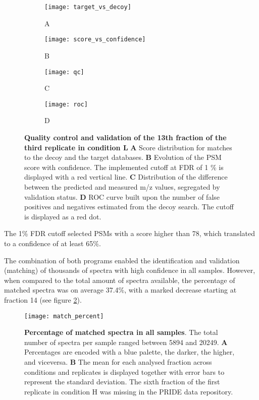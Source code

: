 \begin{figure}[!h]
\centering
\begin{subfigure}{.45\textwidth}
  \centering
  \caption*{A}
  \texttt{[image: target\_vs\_decoy]}
\end{subfigure}
\begin{subfigure}{.45\textwidth}
  \centering
    \caption*{B}
  \texttt{[image: score\_vs\_confidence]}
\end{subfigure}
\bigskip

\begin{subfigure}{.45\textwidth}
  \centering
    \caption*{C}
  \texttt{[image: qc]}
\end{subfigure}
\begin{subfigure}{.45\textwidth}
  \centering
    \caption*{D}
  \texttt{[image: roc]}
\end{subfigure}
\caption[]{\textbf{Quality control and validation of the 13th fraction of the third replicate in condition L} \textbf{A} Score distribution for matches to the decoy and the target databases. \textbf{B} Evolution of the PSM score with confidence. The implemented cutoff at FDR of 1 \% is displayed with a red vertical line. \textbf{C} Distribution of the difference between the predicted and measured \ac{m/z} values, segregated by validation status. \textbf{D} ROC curve built upon the number of false positives and negatives estimated from the decoy search. The cutoff is displayed as a red dot.}
\label{figure:qc_validation}
\end{figure}

 The 1\% FDR cutoff selected PSMs with a score higher than 78, which translated to a confidence of at least 65\%.


The combination of both programs enabled the identification and validation (matching) of thousands of spectra with high confidence in all samples. However, when compared to the total amount of spectra available, the percentage of matched spectra was on average 37.4\%, with a marked decrease starting at fraction 14 (see figure \ref{fig:match_percent}).

\begin{figure}[!h]
\centering
\texttt{[image: match\_percent]}
\caption[Percentage of matched spectra in all samples]{\textbf{Percentage of matched spectra in all samples}. The total number of spectra per sample ranged between 5894 and 20249. \textbf{A} Percentages are encoded with a blue palette, the darker, the higher, and viceversa. \textbf{B} The mean for each analysed fraction across conditions and replicates is displayed together with error bars to represent the standard deviation. The sixth fraction of the first replicate in condition H was missing in the PRIDE data repository.}
\label{fig:match_percent}
\end{figure}

